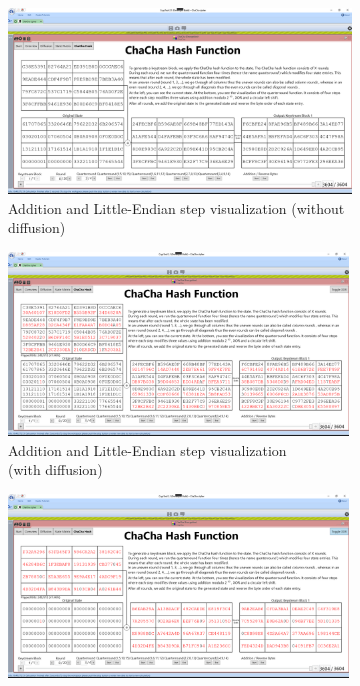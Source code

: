 \begin{figure}
\centering
\begin{subfigure}{\textwidth}
  \centering
  \includegraphics[width=\textwidth]{figures/ct2/chachahash/chachahash-end.png}
  \caption{Addition and Little-Endian step visualization (without diffusion)}
  \label{fig:chachahash.end.without.diffusion}
\end{subfigure}
\begin{subfigure}[t]{0.5\textwidth}
  \centering
  \includegraphics[width=0.99\textwidth]{figures/ct2/chachahash/chachahash-end-diffusion.png}
  \caption{Addition and Little-Endian step visualization\\(with diffusion)}
  \label{fig:chachahash.end.with.diffusion}
\end{subfigure}%
\begin{subfigure}[t]{0.5\textwidth}
  \centering
  \includegraphics[width=0.99\textwidth]{figures/ct2/chachahash/chachahash-end-diffusion-xor.png}

\end{subfigure}
\end{figure}
